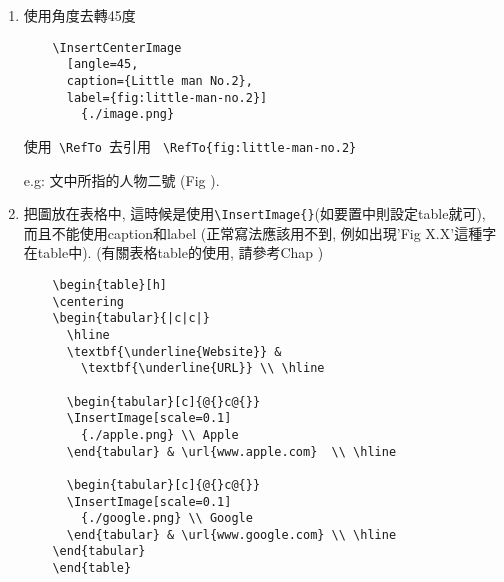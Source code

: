\begin{enumerate}
{    之後可以使用\verb| \RefTo |去引用 \verb| \RefTo{fig:little-man-no.1} |

    e.g: 文中所指的人物一號 (Fig ).
  } %

  \item
  {
    使用角度去轉45度
    \begin{verbatim}
    \InsertCenterImage
      [angle=45,
      caption={Little man No.2},
      label={fig:little-man-no.2}]
        {./image.png}
    \end{verbatim}

    使用\verb| \RefTo |去引用 \verb| \RefTo{fig:little-man-no.2} |

    e.g: 文中所指的人物二號 (Fig ).
  } %

  \newpage
  \item
  {
    把圖放在表格中, 這時候是使用\verb|\InsertImage{}|(如要置中則設定table就可), 而且不能使用caption和label (正常寫法應該用不到, 例如出現'Fig X.X'這種字在table中). (有關表格table的使用, 請參考Chap )

    \begin{verbatim}
    \begin{table}[h]
    \centering
    \begin{tabular}{|c|c|}
      \hline
      \textbf{\underline{Website}} &
        \textbf{\underline{URL}} \\ \hline

      \begin{tabular}[c]{@{}c@{}}
      \InsertImage[scale=0.1]
        {./apple.png} \\ Apple
      \end{tabular} & \url{www.apple.com}  \\ \hline

      \begin{tabular}[c]{@{}c@{}}
      \InsertImage[scale=0.1]
        {./google.png} \\ Google
      \end{tabular} & \url{www.google.com} \\ \hline
    \end{tabular}
    \end{table}
    \end{verbatim}

}
\end{enumerate}
